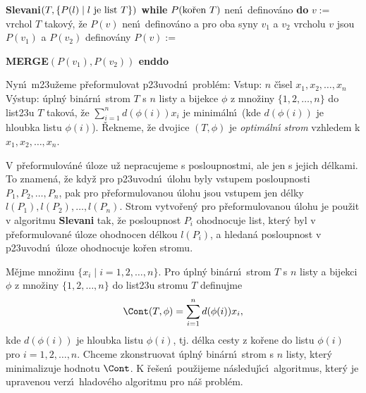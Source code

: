 \documentclass[a4paper,12pt]{article}
\begin{document}
{\bf Slevani$(T,\{P(l)\mid l\text{\rm \ je list }T\})$\newline 
while} $P(\text{\rm ko\v ren }T)$ nen\'\i\ definov\'ano {\bf do\newline 
\phantom{{\rm---}}}$v:=$ vrchol $T$ takov\'y, \v ze $P(v)$ nen\'\i\ 
definov\'ano a\newline 
\phantom{---}pro oba syny $v_1$ a $v_2$ vrcholu $v$ jsou $P(v_1)$ a $
P(v_2)$ definov\'any\newline 
\phantom{---}$P(v):=${\bf MERGE$(P(v_1),P(v_2))$\newline 
enddo
\bigskip

}\flushpar Nyn\'\i\ m\accent23u\v zeme p\v reformulovat p\accent23uvodn\'\i\ 
probl\'em:\newline 
Vstup: $n$ \v c\'\i sel $x_1,x_2,\dots,x_n$\newline 
V\'ystup: \'upln\'y bin\'arn\'\i\ strom $T$ s $n$ listy a bijekce $
\phi$ z 
mno\v ziny $\{1,2,\dots,n\}$ do list\accent23u $T$ takov\'a, \v ze 
$\sum_{i=1}^nd(\phi (i))x_i$ je minim\'aln\'\i\ (kde $d(\phi (i))$ je hloubka 
listu $\phi (i)$).\newline 
\v Rekneme, \v ze dvojice $(T,\phi )$ je \emph{optim\'aln\'\i} 
\emph{strom} vzhledem k $x_1,x_2,\dots,x_n$. 
\medskip

\flushpar V p\v reformulov\'an\'e \'uloze u\v z nepracujeme s 
posloupnostmi, ale jen s jejich d\'elkami. 
To znamen\'a, \v ze kdy\v z pro p\accent23uvodn\'\i\ \'ulohu 
byly vstupem posloupnosti $P_1,P_2,\dots,
P_n$, pak pro 
p\v reformulovanou \'ulohu jsou vstupem jen d\'elky  
$l(P_1),l(P_2),\dots,l(P_n)$. Strom vytvo\v ren\'y pro 
p\v reformulovanou \'ulohu  
je pou\v zit v algoritmu {\bf Slevani}  
tak, \v ze  posloupnost $P_i$ ohodnocuje list, kter\'y byl v 
p\v reformulovan\'e \'uloze ohodnocen d\'elkou $l(P_i)$, a hledan\'a posloupnost 
v p\accent23uvodn\'\i\ \'uloze ohodnocuje ko\v ren stromu. 
\medskip

\flushpar M\v ejme mno\v zinu $\{x_i\mid i=1,2,\dots,n\}$.  Pro \'upln\'y bin\'arn\'\i\ 
strom $T$ s $n$ listy a bijekci $\phi$ z mno\v ziny $\{1,2,\dots,
n\}$ do 
list\accent23u stromu $T$ definujme 
$$\Cont(T,\phi )=\sum_{i=1}^nd(\phi (i))x_i,$$
kde $d(\phi (i))$ je hloubka listu $\phi (i)$, tj.  d\'elka cesty z 
ko\v rene do listu $\phi (i)$  pro $i=1,2,\dots,n$.  
Chceme zkonstruovat \'upln\'y bin\'arn\'\i\ strom s $n$ listy, 
kter\'y minimalizuje hodnotu $\Cont$. K \v re\v sen\'\i\ 
pou\v zijeme n\'asleduj\'\i c\'\i\ algoritmus, kter\'y je upravenou verz\'\i\ 
hladov\'eho algoritmu pro n\'a\v s probl\'em.
\medskip
\end{document}
